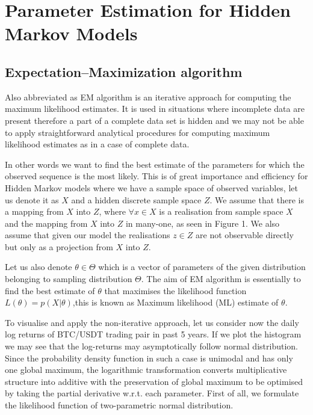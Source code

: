
\chapter{Parameter Estimation for Hidden Markov Models}

\ifpdf
    \graphicspath{{Chapter2/Figs/Raster/}{Chapter2/Figs/PDF/}{Chapter2/Figs/}}
\else
    \graphicspath{{Chapter2/Figs/Vector/}{Chapter2/Figs/}}
\fi

\section{ Expectation–Maximization algorithm}

Also abbreviated as EM algorithm is an iterative approach for computing the maximum likelihood estimates. It is used in situations where incomplete data are present therefore a part of a complete data set is hidden and we may not be able to apply straightforward analytical procedures for computing maximum likelihood estimates as in a case of complete data. 

In other words we want to find the best estimate of the parameters for which the observed sequence is the most likely. This is of great importance and efficiency for Hidden Markov models where we have a sample space of observed variables, let us denote it as $X$ and a hidden discrete sample space $Z$. We assume that there is a mapping from $X$ into $Z$, where $\forall x \in X$ is a realisation from sample space $X$ and the mapping from $X$ into $Z$ in many-one, as seen in Figure 1. We also assume that given our model the realisations $z \in Z$ are not observable directly but only as a projection from $X$ into $Z$. 

Let us also denote $\theta \in \Theta$ which is a vector of parameters of the given distribution belonging to sampling distribution $\Theta$. The aim of EM algorithm is essentially to find the best estimate of $\theta$ that maximises the likelihood function $L(\theta) = p(X|\theta)$,this is known as Maximum likelihood (ML) estimate of $\theta$. 

To visualise and apply the non-iterative approach, let us consider now the daily log returns of BTC/USDT trading pair in past 5 years. If we plot the histogram we may see that the log-returns may asymptotically follow normal distribution. Since the probability density function in such a case is unimodal and has only one global maximum, the logarithmic transformation converts multiplicative structure into additive with the preservation of global maximum to be optimised by taking the partial derivative w.r.t. each parameter. First of all, we formulate the likelihood function of two-parametric normal distribution.
 
